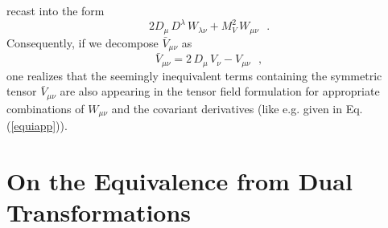 recast into the form
\begin{equation}
 2 D_\mu \, D^\lambda \, W_{\lambda \nu} +  M_V^2 \, W_{\mu \nu} \,
\,\, \, .
\label{equiapp}
\end{equation}
Consequently, if we decompose $\bar{V}_{\mu \nu}$ as
\begin{equation}
 \bar{V}_{\mu \nu} = 2 \, D_\mu \, V_\nu  -  V_{\mu \nu} \,
\,\, \, ,
\label{a16}
\end{equation}
one realizes that the seemingly inequivalent terms containing the
symmetric tensor $\bar{V}_{\mu \nu}$ are also appearing in the tensor
field formulation for  appropriate combinations of $W_{\mu \nu}$ and
the covariant derivatives (like e.g.
given in Eq.(\ref{equiapp})).

\vfill


\setcounter{equation}{0}
\section{On the Equivalence  from Dual Transformations}
\label{appb}

